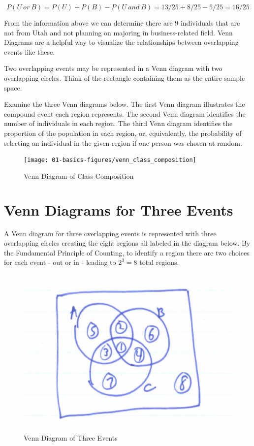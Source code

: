 \documentclass[]{book}
\theoremstyle{definition}
\theoremstyle{definition}
\theoremstyle{definition}
\theoremstyle{remark}
\begin{document}
\[P(U \ or \ B) = P(U)+P(B)-P(U \ and \ B) = 13/25 + 8/25 - 5/25 = 16/25\]

From the information above we can determine there are 9 individuals that
are not from Utah and not planning on majoring in business-related
field. Venn Diagrams are a helpful way to visualize the relationships
between overlapping events like these.

Two overlapping events may be represented in a Venn diagram with two
overlapping circles. Think of the rectangle containing them as the
entire sample space.

Examine the three Venn diagrams below. The first Venn diagram
illustrates the compound event each region represents. The second Venn
diagram identifies the number of individuals in each region. The third
Venn diagram identifies the proportion of the population in each region,
or, equivalently, the probability of selecting an individual in the
given region if one person was chosen at random.

\begin{figure}

{\centering \texttt{[image: 01-basics-figures/venn\_class\_composition]} 

}

\caption{Venn Diagram of Class Composition}\label{fig:nice-fig-51}
\end{figure}

\section{Venn Diagrams for Three
Events}\label{venn-diagrams-for-three-events}

A Venn diagram for three overlapping events is represented with three
overlapping circles creating the eight regions all labeled in the
diagram below. By the Fundamental Principle of Counting, to identify a
region there are two choices for each event - out or in - leading to
\(2^{3}=8\) total regions.

\begin{figure}

{\centering \includegraphics[width=0.3\linewidth]{01-basics-figures/venn_three_events} 

}

\caption{Venn Diagram of Three Events}\label{fig:nice-fig-52}
\end{figure}
\end{document}
